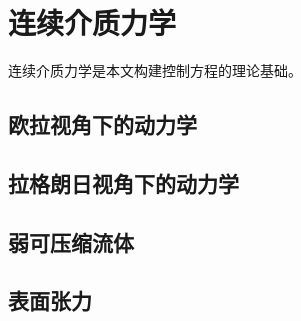 \chapter{连续介质力学} \label{chap2}
连续介质力学是本文构建控制方程的理论基础。
\section{欧拉视角下的动力学}
\section{拉格朗日视角下的动力学}
\section{弱可压缩流体}
\section{表面张力}



